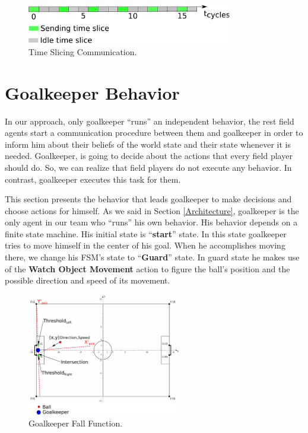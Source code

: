 \begin{figure}[t!]
\centering
  \includegraphics[width=0.8\textwidth]{Chapter3/figures/MAC.pdf}  
  \caption{Time Slicing Communication.}
  \label{fig:TimeSlicing}
\end{figure} 


\section{Goalkeeper Behavior}

In our approach, only goalkeeper ``runs'' an independent behavior, the rest field agents start a communication procedure between them and goalkeeper in order to inform him about their beliefs of the world state and their state whenever it is needed. Goalkeeper, is going to decide about the actions that every field player should do. So, we can realize that field players do not execute any behavior. In contrast, goalkeeper executes this task for them.

This section presents the behavior that leads goalkeeper to make decisions and choose actions for himself. As we said in Section \ref{Architecture}, goalkeeper is the only agent in our team who ``runs'' his own behavior. His behavior depends on a finite state machine. His initial state is ``\textbf{start}'' state. In this state goalkeeper tries to move himself in the center of his goal. When he accomplishes moving there, we change his FSM's state to ``\textbf{Guard}'' state. In guard state he makes use of the \textbf{Watch Object Movement} action to figure the ball's position and the possible direction and speed of its movement.

\begin{figure}[t!]
\centering
  \includegraphics[trim = 0cm 0cm 10cm 0cm, clip,width=0.6\textwidth]{Chapter3/figures/Goalie.pdf}  
  \caption{Goalkeeper Fall Function.}
  \label{fig:Goalkeeper}
\end{figure} 

